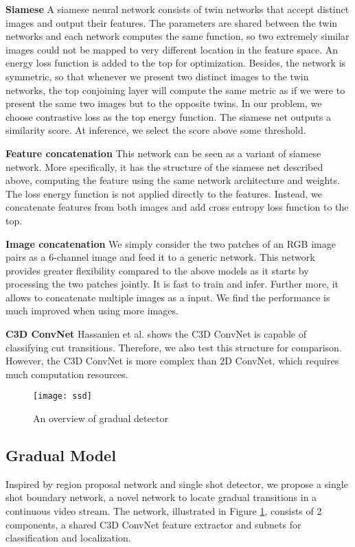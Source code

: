 \documentclass[runningheads]{llncs}
\begin{document}
\textbf{Siamese} A siamese neural network consists of twin networks that accept distinct images and output their features. The parameters are shared between the twin networks and each network computes the same function, so two extremely similar images could not be mapped to very different location in the feature space. An energy loss function is added to the top for optimization. Besides, the network is symmetric, so that whenever we present two distinct images to the twin networks, the top conjoining layer will compute the same metric as if we were to present the same two images but to the opposite twins. In our problem, we choose contrastive loss as the top energy function. The siamese net outputs a similarity score. At inference, we select the score above some threshold. 

\textbf{Feature concatenation} This network can be seen as a variant of siamese network. More specifically, it has the structure of the siamese net described above, computing the feature using the same network architecture and weights. The loss energy function is not applied directly to the features. Instead, we concatenate features from both images and add cross entropy loss function to the top.

\textbf{Image concatenation} We simply consider the two patches of an RGB image pairs as a 6-channel image and feed it to a generic network. This network provides greater flexibility compared to the above models as it starts by processing the two patches jointly. It is fast to train and infer. Further more, it allows to concatenate multiple images as a input. We find the performance is much improved when using more images.

\textbf{C3D ConvNet} Hassanien et al.\cite{hassanien2017large} shows the C3D ConvNet is capable of classifying cut transitions. Therefore, we also test this structure for comparison. However, the C3D ConvNet is more complex than 2D ConvNet, which requires much computation resources. 

\begin{figure}
\centering
\texttt{[image: ssd]}
\caption{An overview of gradual detector}\label{fig:3}
\end{figure}

\subsection{Gradual Model}
Inspired by region proposal network\cite{renNIPS15fasterrcnn} and single shot detector\cite{liu2016ssd}, we propose a single shot boundary network, a novel network to locate gradual transitions in a continuous video stream. The network, illustrated in Figure \ref{fig:3}, consists of 2 components, a shared C3D ConvNet feature extractor and subnets for classification and localization.
\end{document}
